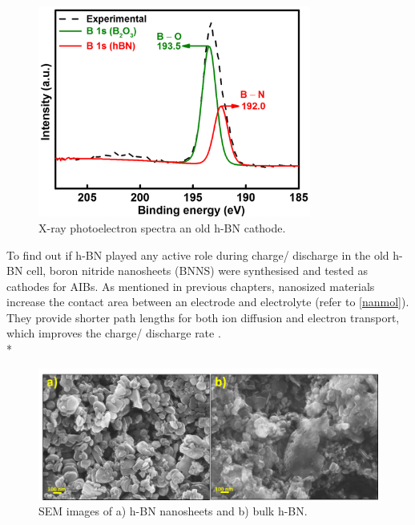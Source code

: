 \begin{figure}[tbh!]
\centering
\includegraphics[width=0.8\textwidth]{Figures/BOhBN/oldxps}
\caption{X-ray photoelectron spectra an old h-BN cathode.}
\label{Figures/BOhBN:oldxps}
\end{figure}

To find out if h-BN played any active role during charge/ discharge in the old h-BN cell, boron nitride nanosheets (BNNS) were synthesised and tested as cathodes for AIBs. As mentioned in previous chapters, nanosized materials increase the contact area between an electrode and electrolyte (refer to \ref{nanmol}). They provide shorter path lengths for both ion diffusion and electron transport, which improves the charge/ discharge rate \cite{zhang_ultrathin_2015,cong_intrinsic_2015}. \\*


\begin{figure}[tbh!]
\centering
\includegraphics[width=\textwidth]{Figures/BOhBN/BNNSSEM}
\caption{SEM images of a) h-BN nanosheets and b) bulk h-BN.}
\label{Figures/BOhBN:BNNSSEM}
\end{figure}

